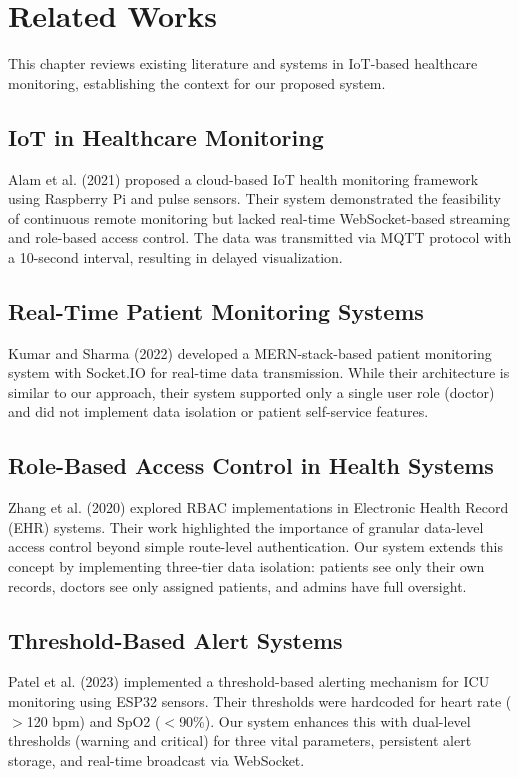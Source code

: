 \documentclass[12pt,a4paper]{report}
\begin{document}
\chapter{Related Works}

This chapter reviews existing literature and systems in IoT-based healthcare monitoring, establishing the context for our proposed system.

\section{IoT in Healthcare Monitoring}
Alam et al. (2021) proposed a cloud-based IoT health monitoring framework using Raspberry Pi and pulse sensors. Their system demonstrated the feasibility of continuous remote monitoring but lacked real-time WebSocket-based streaming and role-based access control. The data was transmitted via MQTT protocol with a 10-second interval, resulting in delayed visualization.

\section{Real-Time Patient Monitoring Systems}
Kumar and Sharma (2022) developed a MERN-stack-based patient monitoring system with Socket.IO for real-time data transmission. While their architecture is similar to our approach, their system supported only a single user role (doctor) and did not implement data isolation or patient self-service features.

\section{Role-Based Access Control in Health Systems}
Zhang et al. (2020) explored RBAC implementations in Electronic Health Record (EHR) systems. Their work highlighted the importance of granular data-level access control beyond simple route-level authentication. Our system extends this concept by implementing three-tier data isolation: patients see only their own records, doctors see only assigned patients, and admins have full oversight.

\section{Threshold-Based Alert Systems}
Patel et al. (2023) implemented a threshold-based alerting mechanism for ICU monitoring using ESP32 sensors. Their thresholds were hardcoded for heart rate ($>$120 bpm) and SpO2 ($<$90\%). Our system enhances this with dual-level thresholds (warning and critical) for three vital parameters, persistent alert storage, and real-time broadcast via WebSocket.
\end{document}
